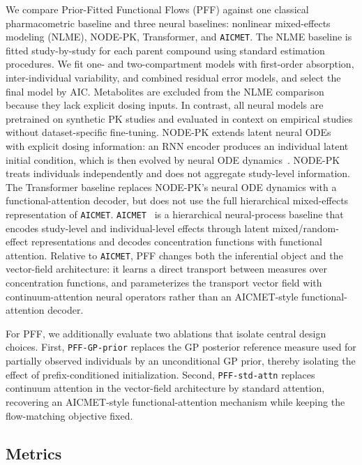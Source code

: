 We compare Prior-Fitted Functional Flows (PFF) against one classical pharmacometric baseline and three neural baselines: nonlinear mixed-effects modeling (NLME), NODE-PK, Transformer, and \texttt{AICMET}.
%
The NLME baseline is fitted study-by-study for each parent compound using standard estimation procedures. We fit one- and two-compartment models with first-order absorption, inter-individual variability, and combined residual error models, and select the final model by AIC. Metabolites are excluded from the NLME comparison because they lack explicit dosing inputs.
%
In contrast, all neural models are pretrained on synthetic PK studies and evaluated in context on empirical studies without dataset-specific fine-tuning.
%
NODE-PK extends latent neural ODEs~\citep{rubanova2019latent} with explicit dosing information: an RNN encoder produces an individual latent initial condition, which is then evolved by neural ODE dynamics~\citep{lu2021deep}. NODE-PK treats individuals independently and does not aggregate study-level information.
%
The Transformer baseline replaces NODE-PK's neural ODE dynamics with a functional-attention decoder, but does not use the full hierarchical mixed-effects representation of \texttt{AICMET}.
%
\texttt{AICMET}~\citep{marin2025amortized} is a hierarchical neural-process baseline that encodes study-level and individual-level effects through latent mixed/random-effect representations and decodes concentration functions with functional attention.
%
Relative to \texttt{AICMET}, PFF changes both the inferential object and the vector-field architecture: it learns a direct transport between measures over concentration functions, and parameterizes the transport vector field with continuum-attention neural operators rather than an AICMET-style functional-attention decoder.

For PFF, we additionally evaluate two ablations that isolate central design choices.
%
First, \texttt{PFF-GP-prior} replaces the GP posterior reference measure used for partially observed individuals by an unconditional GP prior, thereby isolating the effect of prefix-conditioned initialization.
%
Second, \texttt{PFF-std-attn} replaces continuum attention in the vector-field architecture by standard attention, recovering an AICMET-style functional-attention mechanism while keeping the flow-matching objective fixed.


\subsection{Metrics}

